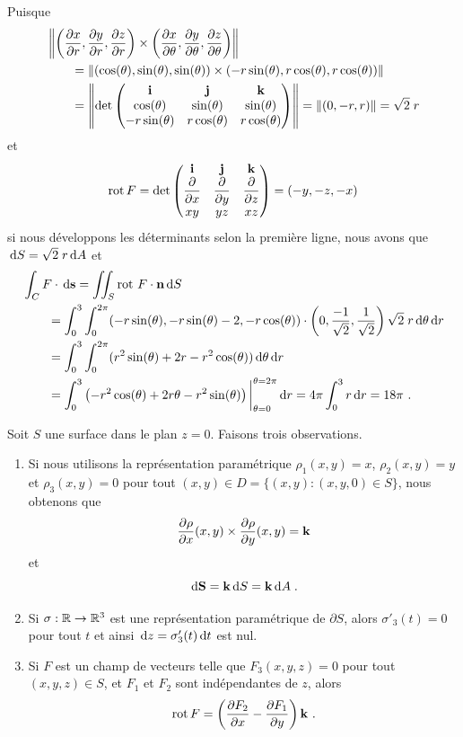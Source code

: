 {\begin{egg}
Puisque
\begin{align*}
&\left\| \left( \frac{\partial x}{\partial r} ,\frac{\partial y}{\partial r} ,\frac{\partial z}{\partial r} \right)
\times \left( \frac{\partial x}{\partial \theta} ,\frac{\partial y}{\partial \theta} ,\frac{\partial z}{\partial \theta} \right)
\right\| \\
&\qquad =
\left\| \left( \cos(\theta) , \sin(\theta) , \sin(\theta) \right)
\times \left( -r \sin(\theta) , r\cos(\theta) , r\cos(\theta) \right)
\right\| \\
&\qquad =
\left\| \det \begin{pmatrix}
\mathbf{i} & \mathbf{j} & \mathbf{k} \\
\cos(\theta) & \sin(\theta) & \sin(\theta) \\
-r \sin(\theta) & r\cos(\theta) & r\cos(\theta)
\end{pmatrix} \right\|
= \| ( 0, -r, r ) \|
= \sqrt{2}\; r
\end{align*}
et
\[
\operatorname{rot} F = \det \begin{pmatrix}
\mathbf{i} & \mathbf{j} & \mathbf{k} \\
\displaystyle \frac{\partial }{\partial x} & \displaystyle \frac{\partial }{\partial y} &
\displaystyle \frac{\partial }{\partial z} \\
xy & yz & xz
\end{pmatrix}
= (-y, -z , -x )
\]
si nous développons les déterminants selon la première ligne, nous
avons que $\,\mathrm{d}S = \sqrt{2}\;r \,\mathrm{d}A$ et
\begin{align*}
&\int_C F \cdot \,\mathrm{d}\mathbf{s} = \iint_S \operatorname{rot}\,F \cdot \mathbf{n} \,\mathrm{d}S \\
&\qquad = \int_0^3 \int_0^{2\pi} (-r\sin(\theta), -r\sin(\theta)-2,
-r \cos(\theta)) \cdot
\left(0 , \frac{-1}{\sqrt{2}}, \frac{1}{\sqrt{2}} \right) \sqrt{2}\; r
\,\mathrm{d}\theta\,\mathrm{d}r \\
&\qquad = \int_0^3 \int_0^{2\pi} (r^2\sin(\theta) + 2r - r^2 \cos(\theta) )
\,\mathrm{d}\theta\,\mathrm{d}r \\
&\qquad = \int_0^3 \left( -r^2\cos(\theta) + 2r\theta - r^2 \sin(\theta)
\right)\bigg|_{\theta=0}^{\theta=2\pi} \,\mathrm{d}r
= 4 \pi \int_0^3 r \,\mathrm{d}r = 18 \pi \ .
\end{align*}
\end{egg}

Soit $S$ une surface dans le plan $z=0$.  Faisons trois observations.
\begin{enumerate}
\item Si nous utilisons la représentation paramétrique
$\rho_1(x,y) = x$, $\rho_2(x,y) = y$ et $\rho_3(x,y) = 0$ pour tout
$(x,y) \in D = \{ (x,y) : (x,y,0) \in S\}$, nous obtenons que
\[
\frac{\partial \rho}{\partial x}(x,y) \times \frac{\partial \rho}{\partial y}(x,y) = \mathbf{k}
\]
et
\[
\,\mathrm{d}\mathbf{S} = \mathbf{k} \,\mathrm{d}S = \mathbf{k} \,\mathrm{d}A  \; .
\]
\item Si $\sigma:\mathbb{R} \to \mathbb{R}^3$ est une représentation paramétrique de
$\partial S$, alors $\sigma'_3(t) = 0$ pour tout $t$ et ainsi
$\,\mathrm{d}z = \sigma_3'(t) \,\mathrm{d}t$ est nul. 
\item Si $F$ est un champ de vecteurs telle que $F_3(x,y,z) = 0$ pour tout
$(x,y,z) \in S$, et $F_1$ et $F_2$ sont indépendantes de $z$, alors
\[
  \operatorname{rot} F = \left( \frac{\partial F_2}{\partial x} - \frac{\partial F_1}{\partial y} \right)\mathbf{k} \ .
\]
\end{enumerate}

}
